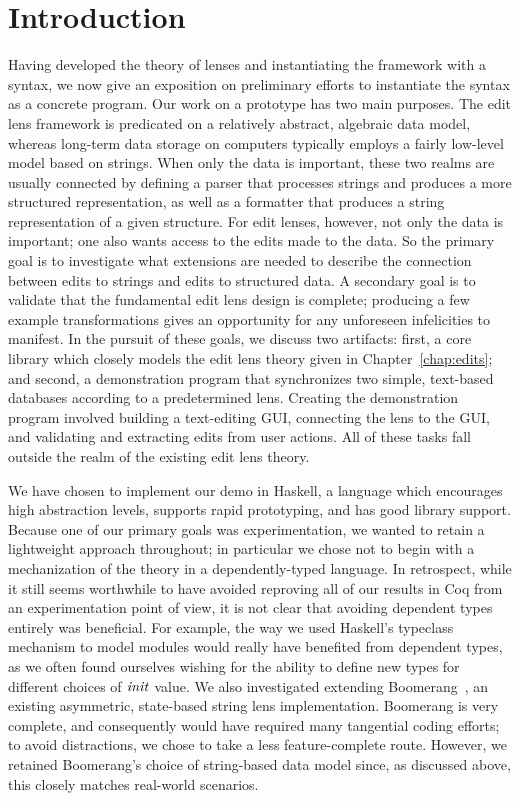 \section{Introduction}
\label{sec:impl-intro}
Having developed the theory of lenses and instantiating the framework with a
syntax, we now give an exposition on preliminary efforts to instantiate the
syntax as a concrete program. Our work on a prototype has two main purposes.
The edit lens framework is predicated on a relatively abstract, algebraic
data model, whereas long-term data storage on computers typically employs a
fairly low-level model based on strings. When only the data is important,
these two realms are usually connected by defining a parser that processes
strings and produces a more structured representation, as well as a
formatter that produces a string representation of a given structure. For
edit lenses, however, not only the data is important; one also wants access
to the edits made to the data. So the primary goal is to investigate what
extensions are needed to describe the connection between edits to strings
and edits to structured data. A secondary goal is to validate that the
fundamental edit lens design is complete; producing a few example
transformations gives an opportunity for any unforeseen infelicities to
manifest. In the pursuit of these goals, we discuss two artifacts: first,
a core library which closely models the edit lens theory given in
Chapter~\ref{chap:edits}; and second, a demonstration program that
synchronizes two simple, text-based databases according to a predetermined
lens. Creating the demonstration program involved building a text-editing
GUI, connecting the lens to the GUI, and validating and extracting edits
from user actions. All of these tasks fall outside the realm of the existing
edit lens theory.

We have chosen to implement our demo in Haskell, a language which encourages
high abstraction levels, supports rapid prototyping, and has good library
support. Because one of our primary goals was experimentation, we wanted to
retain a lightweight approach throughout; in particular we chose not to
begin with a mechanization of the theory in a dependently-typed language.
In retrospect, while it still seems worthwhile to have avoided reproving
all of our results in Coq from an experimentation point of view, it is not
clear that avoiding dependent types entirely was beneficial. For example,
the way we used Haskell's typeclass mechanism to model modules would really
have benefited from dependent types, as we often found ourselves wishing for
the ability to define new types for different choices of $\mathit{init}$ value. We
also investigated extending Boomerang~\cite{Boomerang07}, an existing
asymmetric, state-based string lens implementation. Boomerang is very
complete, and consequently would have required many tangential coding
efforts; to avoid distractions, we chose to take a less feature-complete
route. However, we retained Boomerang's choice of string-based data model
since, as discussed above, this closely matches real-world scenarios.

